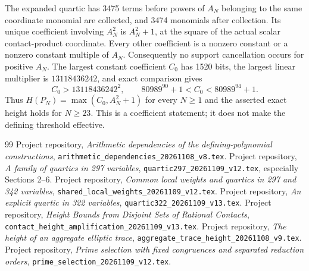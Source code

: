 \documentclass[11pt,a4paper]{article}
\begin{document}
The expanded quartic has 3475 terms before powers of $A_N$ belonging
to the same coordinate monomial are collected, and 3474 monomials
after collection. Its unique coefficient involving $A_N^2$ is
$A_N^2+1$, at the square of the actual scalar contact-product coordinate.
Every other coefficient is a nonzero constant or a nonzero constant
multiple of $A_N$. Consequently no support cancellation occurs for
positive $A_N$. The largest constant coefficient $C_0$ has 1520 bits,
the largest linear multiplier is $13118436242$, and exact comparison
gives
\[
 C_0>13118436242^2,\qquad
 80989^{90}+1<C_0<80989^{94}+1.
\]
Thus $H(P_N)=\max(C_0,A_N^2+1)$ for every $N\ge1$ and the asserted
exact height holds for $N\ge23$. This is a coefficient statement;
it does not make the defining threshold effective.

\begin{thebibliography}{99}
 Project repository,
\emph{Arithmetic dependencies of the defining-polynomial constructions},
\nolinkurl{arithmetic_dependencies_20261108_v8.tex}.
 Project repository,
\emph{A family of quartics in 297 variables},
\nolinkurl{quartic297_20261109_v12.tex}, especially Sections 2--6.
 Project repository,
\emph{Common local weights and quartics in 297 and 342 variables},
\nolinkurl{shared_local_weights_20261109_v12.tex}.
 Project repository,
\emph{An explicit quartic in 322 variables},
\nolinkurl{quartic322_20261109_v13.tex}.
 Project repository,
\emph{Height Bounds from Disjoint Sets of Rational Contacts},
\nolinkurl{contact_height_amplification_20261109_v13.tex}.
 Project repository,
\emph{The height of an aggregate elliptic trace},
\nolinkurl{aggregate_trace_height_20261108_v9.tex}.
 Project repository,
\emph{Prime selection with fixed congruences and separated reduction orders},
\nolinkurl{prime_selection_20261109_v12.tex}.
\end{thebibliography}
\end{document}
